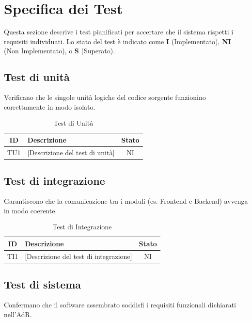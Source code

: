 \section{Specifica dei Test}
Questa sezione descrive i test pianificati per accertare che il sistema rispetti i requisiti individuati. Lo stato del test è indicato come \textbf{I} (Implementato), \textbf{NI} (Non Implementato), o \textbf{S} (Superato).

\subsection{Test di unità}
Verificano che le singole unità logiche del codice sorgente funzionino correttamente in modo isolato.

\begin{table}[H]
	\centering
	\renewcommand{\arraystretch}{1.3}
	\begin{tabularx}{\textwidth}{|c|X|c|}
		\hline
		\rowcolor{primarycolor!10}
		\textbf{ID} & \textbf{Descrizione} & \textbf{Stato} \\
		\hline
		TU1 & {[Descrizione del test di unità]} & NI \\
		\hline
	\end{tabularx}
	\caption{Test di Unità}
\end{table}

\subsection{Test di integrazione}
Garantiscono che la comunicazione tra i moduli (es. Frontend e Backend) avvenga in modo coerente.

\begin{table}[H]
	\centering
	\renewcommand{\arraystretch}{1.3}
	\begin{tabularx}{\textwidth}{|c|X|c|}
		\hline
		\rowcolor{primarycolor!10}
		\textbf{ID} & \textbf{Descrizione} & \textbf{Stato} \\
		\hline
		TI1 & {[Descrizione del test di integrazione]} & NI \\
		\hline
	\end{tabularx}
	\caption{Test di Integrazione}
\end{table}

\subsection{Test di sistema}
Confermano che il software assembrato soddisfi i requisiti funzionali dichiarati nell'AdR.

